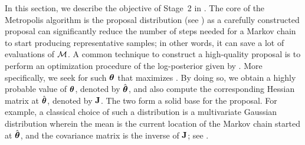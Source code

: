 In this section, we describe the objective of Stage~2 in .
The core of the Metropolis algorithm is the proposal distribution (see ) as a carefully constructed proposal can significantly reduce the number of steps needed for a Markov chain to start producing representative samples; in other words, it can save a lot of evaluations of $\model$.
A common technique to construct a high-quality proposal is to perform an optimization procedure of the log-posterior given by . More specifically, we seek for such ${\boldsymbol\theta}$ that maximizes .
By doing so, we obtain a highly probable value of ${\boldsymbol\theta}$, denoted by $\hat{{\boldsymbol\theta}}$, and also compute the corresponding Hessian matrix at $\hat{{\boldsymbol\theta}}$, denoted by $\mathbf{J}$. The two form a solid base for the proposal.
For example, a classical choice of such a distribution is a multivariate Gaussian distribution wherein the mean is the current location of the Markov chain started at $\hat{{\boldsymbol\theta}}$, and the covariance matrix is the inverse of $\mathbf{J}$; see \cite{gelman2004, bernardo2007}.
